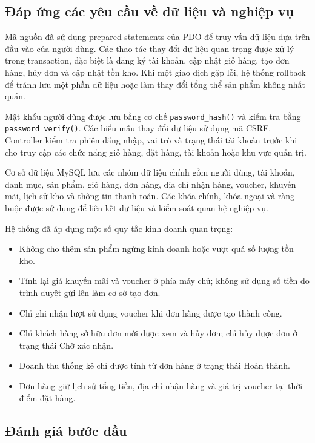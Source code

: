 \subsection{Đáp ứng các yêu cầu về dữ liệu và nghiệp vụ}

Mã nguồn đã sử dụng prepared statements của PDO để truy vấn dữ liệu dựa trên đầu vào của người dùng. Các thao tác thay đổi dữ liệu quan trọng được xử lý trong transaction, đặc biệt là đăng ký tài khoản, cập nhật giỏ hàng, tạo đơn hàng, hủy đơn và cập nhật tồn kho. Khi một giao dịch gặp lỗi, hệ thống rollback để tránh lưu một phần dữ liệu hoặc làm thay đổi tổng thể sản phẩm không nhất quán.

Mật khẩu người dùng được lưu bằng cơ chế \texttt{password\_hash()} và kiểm tra bằng \texttt{password\_verify()}. Các biểu mẫu thay đổi dữ liệu sử dụng mã CSRF. Controller kiểm tra phiên đăng nhập, vai trò và trạng thái tài khoản trước khi cho truy cập các chức năng giỏ hàng, đặt hàng, tài khoản hoặc khu vực quản trị.

Cơ sở dữ liệu MySQL lưu các nhóm dữ liệu chính gồm người dùng, tài khoản, danh mục, sản phẩm, giỏ hàng, đơn hàng, địa chỉ nhận hàng, voucher, khuyến mãi, lịch sử kho và thông tin thanh toán. Các khóa chính, khóa ngoại và ràng buộc được sử dụng để liên kết dữ liệu và kiểm soát quan hệ nghiệp vụ.

Hệ thống đã áp dụng một số quy tắc kinh doanh quan trọng:
\begin{itemize}
    \item Không cho thêm sản phẩm ngừng kinh doanh hoặc vượt quá số lượng tồn kho.
    \item Tính lại giá khuyến mãi và voucher ở phía máy chủ; không sử dụng số tiền do trình duyệt gửi lên làm cơ sở tạo đơn.
    \item Chỉ ghi nhận lượt sử dụng voucher khi đơn hàng được tạo thành công.
    \item Chỉ khách hàng sở hữu đơn mới được xem và hủy đơn; chỉ hủy được đơn ở trạng thái Chờ xác nhận.
    \item Doanh thu thống kê chỉ được tính từ đơn hàng ở trạng thái Hoàn thành.
    \item Đơn hàng giữ lịch sử tổng tiền, địa chỉ nhận hàng và giá trị voucher tại thời điểm đặt hàng.
\end{itemize}

\subsection{Đánh giá bước đầu}

